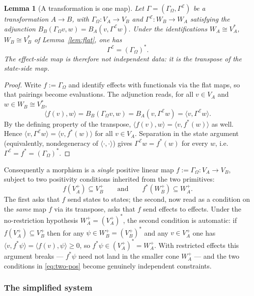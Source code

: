 \documentclass[prl,aps,10pt,superscriptaddress, floatfix]{revtex4-2}
\newtheorem{lemma}{Lemma}
\begin{document}
\begin{lemma}[A transformation is one map]\label{lem:onemap}
Let $\Gamma=(\Gamma_\Omega,\Gamma^{\mathcal E})$ be a transformation $A\to B$, with $\Gamma_\Omega:V_A\to V_B$ and $\Gamma^{\mathcal E}:W_B\to W_A$ satisfying the adjunction $B_B(\Gamma_\Omega v,w)=B_A(v,\Gamma^{\mathcal E}w)$. Under the identifications $W_A\cong V_A^*$, $W_B\cong V_B^*$ of Lemma~\ref{lem:flat}, one has
\[
\Gamma^{\mathcal E}=(\Gamma_\Omega)^*.
\]
The effect-side map is therefore not independent data: it is the transpose of the state-side map.
\end{lemma}

\begin{proof}
Write $f:=\Gamma_\Omega$ and identify effects with functionals via the flat maps, so that pairings become evaluations. The adjunction reads, for all $v\in V_A$ and $w\in W_B\cong V_B^*$,
\[
\langle f(v),w\rangle=B_B(\Gamma_\Omega v,w)=B_A(v,\Gamma^{\mathcal E}w)=\langle v,\Gamma^{\mathcal E}w\rangle.
\]
By the defining property of the transpose, $\langle f(v),w\rangle=\langle v,f^*(w)\rangle$ as well. Hence $\langle v,\Gamma^{\mathcal E}w\rangle=\langle v,f^*(w)\rangle$ for all $v\in V_A$. Separation in the state argument (equivalently, nondegeneracy of $\langle\cdot,\cdot\rangle$) gives $\Gamma^{\mathcal E}w=f^*(w)$ for every $w$, i.e.\ $\Gamma^{\mathcal E}=f^*=(\Gamma_\Omega)^*$.
\end{proof}

Consequently a morphism is a \emph{single} positive linear map $f:=\Gamma_\Omega:V_A\to V_B$, subject to two positivity conditions inherited from the two primitives:
\begin{equation}\label{eq:two-pos}
f(V_A^+)\subseteq V_B^+\qquad\text{and}\qquad f^*(W_B^+)\subseteq W_A^+ .
\end{equation}
The first asks that $f$ send states to states; the second, now read as a condition on the \emph{same} map $f$ via its transpose, asks that $f$ send effects to effects. Under the no-restriction hypothesis $W_A^+=(V_A^+)^*$, the second condition is automatic: if $f(V_A^+)\subseteq V_B^+$ then for any $\psi\in W_B^+=(V_B^+)^*$ and any $v\in V_A^+$ one has $\langle v,f^*\psi\rangle=\langle f(v),\psi\rangle\ge0$, so $f^*\psi\in(V_A^+)^*=W_A^+$. With restricted effects this argument breaks --- $f^*\psi$ need not land in the smaller cone $W_A^+$ --- and the two conditions in \eqref{eq:two-pos} become genuinely independent constraints.

\subsubsection*{The simplified system}
\end{document}
